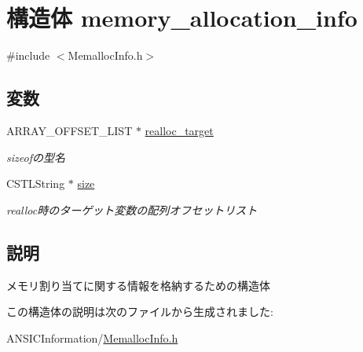 \section{構造体 memory\_\-allocation\_\-info}
\label{structmemory__allocation__info}


{\ttfamily \#include $<$MemallocInfo.h$>$}

\subsection*{変数}
\begin{DoxyCompactItemize}
\item 
ARRAY\_\-OFFSET\_\-LIST $\ast$ \hyperlink{structmemory__allocation__info_af1edaa8634179c3185a37cb1518e4fde}{realloc\_\-target}\label{structmemory__allocation__info_af1edaa8634179c3185a37cb1518e4fde}

\begin{DoxyCompactList}\small\item\em sizeofの型名 \item\end{DoxyCompactList}\item 
CSTLString $\ast$ \hyperlink{structmemory__allocation__info_a0ad96160d67dbf835dd7d599ece0d9b4}{size}\label{structmemory__allocation__info_a0ad96160d67dbf835dd7d599ece0d9b4}

\begin{DoxyCompactList}\small\item\em realloc時のターゲット変数の配列オフセットリスト \item\end{DoxyCompactList}\end{DoxyCompactItemize}


\subsection{説明}
メモリ割り当てに関する情報を格納するための構造体 

この構造体の説明は次のファイルから生成されました:\begin{DoxyCompactItemize}
\item 
ANSICInformation/\hyperlink{MemallocInfo_8h}{MemallocInfo.h}\end{DoxyCompactItemize}
